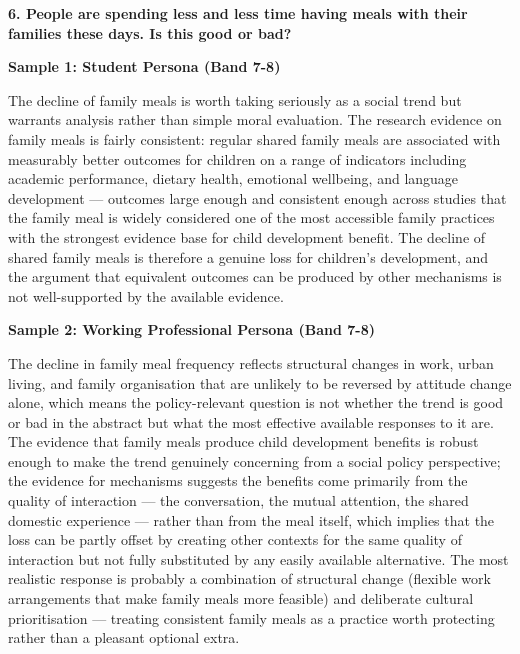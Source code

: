 \separator

\begin{ieltsquestion}
\textbf{6. People are spending less and less time having meals with their families these days. Is this good or bad?}
\end{ieltsquestion}
\textbf{Sample 1: Student Persona (Band 7-8)}

The decline of family meals is worth taking seriously as a social trend but warrants analysis rather than simple moral evaluation. The research evidence on family meals is fairly consistent: regular shared family meals are associated with measurably better outcomes for children on a range of indicators including academic performance, dietary health, emotional wellbeing, and language development — outcomes large enough and consistent enough across studies that the family meal is widely considered one of the most accessible family practices with the strongest evidence base for child development benefit. The decline of shared family meals is therefore a genuine loss for children's development, and the argument that equivalent outcomes can be produced by other mechanisms is not well-supported by the available evidence.

\textbf{Sample 2: Working Professional Persona (Band 7-8)}

The decline in family meal frequency reflects structural changes in work, urban living, and family organisation that are unlikely to be reversed by attitude change alone, which means the policy-relevant question is not whether the trend is good or bad in the abstract but what the most effective available responses to it are. The evidence that family meals produce child development benefits is robust enough to make the trend genuinely concerning from a social policy perspective; the evidence for mechanisms suggests the benefits come primarily from the quality of interaction — the conversation, the mutual attention, the shared domestic experience — rather than from the meal itself, which implies that the loss can be partly offset by creating other contexts for the same quality of interaction but not fully substituted by any easily available alternative. The most realistic response is probably a combination of structural change (flexible work arrangements that make family meals more feasible) and deliberate cultural prioritisation — treating consistent family meals as a practice worth protecting rather than a pleasant optional extra.

\separator


